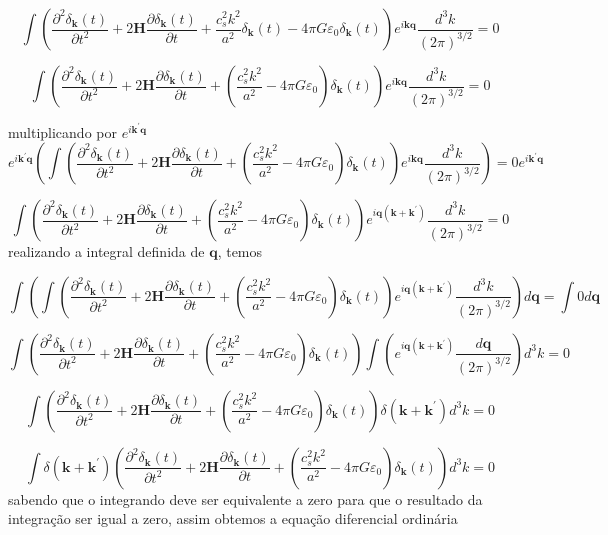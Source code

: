 \documentclass[a4paper,12pt]{article}
\begin{document}
$$\int \left(\dfrac{\partial^2\delta_\mathbf{k}(t)}{\partial t^2}+ 2\mathbf{H}\dfrac{\partial\delta_\mathbf{k}(t)}{\partial t} + \dfrac{c^2_sk^2}{a^2}\delta_\mathbf{k}(t) - 4\pi G\varepsilon_0\delta_\mathbf{k}(t) \right) e^{i\mathbf{k}\mathbf{q}}\dfrac{d^3k}{(2\pi)^{3/2}} =0 $$

$$\int \left(\dfrac{\partial^2\delta_\mathbf{k}(t)}{\partial t^2}+ 2\mathbf{H}\dfrac{\partial\delta_\mathbf{k}(t)}{\partial t} +( \dfrac{c^2_sk^2}{a^2} - 4\pi G\varepsilon_0)\delta_\mathbf{k}(t) \right) e^{i\mathbf{k}\mathbf{q}}\dfrac{d^3k}{(2\pi)^{3/2}} =0 $$

multiplicando por $e^{i\mathbf{k}^\prime\mathbf{q}}$
$$e^{i\mathbf{k}^\prime\mathbf{q}}\left(\int \left(\dfrac{\partial^2\delta_\mathbf{k}(t)}{\partial t^2}+ 2\mathbf{H}\dfrac{\partial\delta_\mathbf{k}(t)}{\partial t} +( \dfrac{c^2_sk^2}{a^2} - 4\pi G\varepsilon_0)\delta_\mathbf{k}(t) \right) e^{i\mathbf{k}\mathbf{q}}\dfrac{d^3k}{(2\pi)^{3/2}}\right) =0e^{i\mathbf{k}^\prime\mathbf{q}} $$

$$\int \left(\dfrac{\partial^2\delta_\mathbf{k}(t)}{\partial t^2}+ 2\mathbf{H}\dfrac{\partial\delta_\mathbf{k}(t)}{\partial t} +( \dfrac{c^2_sk^2}{a^2} - 4\pi G\varepsilon_0)\delta_\mathbf{k}(t) \right) e^{i\mathbf{q}(\mathbf{k}+\mathbf{k}^\prime)}\dfrac{d^3k}{(2\pi)^{3/2}} =0 $$
realizando a integral definida de $\mathbf{q}$, temos

$$\int\left( \int \left(\dfrac{\partial^2\delta_\mathbf{k}(t)}{\partial t^2}+ 2\mathbf{H}\dfrac{\partial\delta_\mathbf{k}(t)}{\partial t} +( \dfrac{c^2_sk^2}{a^2} - 4\pi G\varepsilon_0)\delta_\mathbf{k}(t) \right) e^{i\mathbf{q}(\mathbf{k}+\mathbf{k}^\prime)}\dfrac{d^3k}{(2\pi)^{3/2}} \right)d\mathbf{q} =\int0d\mathbf{q} $$

$$ \int \left(\dfrac{\partial^2\delta_\mathbf{k}(t)}{\partial t^2}+ 2\mathbf{H}\dfrac{\partial\delta_\mathbf{k}(t)}{\partial t} +( \dfrac{c^2_sk^2}{a^2} - 4\pi G\varepsilon_0)\delta_\mathbf{k}(t) \right) \int\left(e^{i\mathbf{q}(\mathbf{k}+\mathbf{k}^\prime)}\dfrac{d\mathbf{q}}{(2\pi)^{3/2}} \right)d^3k =0 $$

$$ \int \left(\dfrac{\partial^2\delta_\mathbf{k}(t)}{\partial t^2}+ 2\mathbf{H}\dfrac{\partial\delta_\mathbf{k}(t)}{\partial t} +( \dfrac{c^2_sk^2}{a^2} - 4\pi G\varepsilon_0)\delta_\mathbf{k}(t) \right) \delta(\mathbf{k}+\mathbf{k}^\prime)d^3k =0 $$

$$\int\delta(\mathbf{k}+\mathbf{k}^\prime)\left(\dfrac{\partial^2\delta_\mathbf{k}(t)}{\partial t^2}+ 2\mathbf{H}\dfrac{\partial\delta_\mathbf{k}(t)}{\partial t} +( \dfrac{c^2_sk^2}{a^2} - 4\pi G\varepsilon_0)\delta_\mathbf{k}(t) \right) d^3k =0 $$
sabendo que o integrando deve ser equivalente a zero para que o resultado da integração ser igual a zero, assim obtemos a equação diferencial ordinária
 
\end{document}
